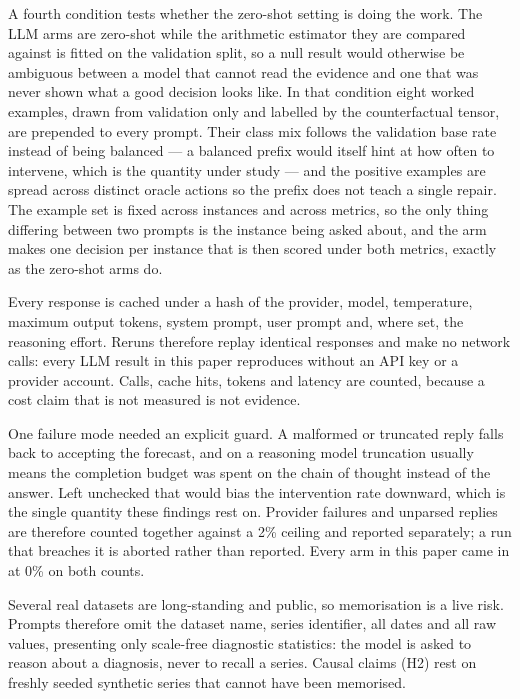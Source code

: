 A fourth condition tests whether the zero-shot setting is doing the work. The LLM arms
are zero-shot while the arithmetic estimator they are compared against is fitted on the
validation split, so a null result would otherwise be ambiguous between a model that
cannot read the evidence and one that was never shown what a good decision looks like.
In that condition eight worked examples, drawn from validation only and labelled by the
counterfactual tensor, are prepended to every prompt. Their class mix follows the
validation base rate instead of being balanced --- a balanced prefix would itself hint
at how often to intervene, which is the quantity under study --- and the positive
examples are spread across distinct oracle actions so the prefix does not teach a single
repair. The example set is fixed across instances and across metrics, so the only thing
differing between two prompts is the instance being asked about, and the arm makes one
decision per instance that is then scored under both metrics, exactly as the zero-shot
arms do.

Every response is cached under a hash of the provider, model, temperature, maximum
output tokens, system prompt, user prompt and, where set, the reasoning effort. Reruns
therefore replay identical responses and make no network calls: every LLM result in this
paper reproduces without an API key or a provider account. Calls, cache hits, tokens and
latency are counted, because a cost claim that is not measured is not evidence.

One failure mode needed an explicit guard. A malformed or truncated reply falls back to
accepting the forecast, and on a reasoning model truncation usually means the completion
budget was spent on the chain of thought instead of the answer. Left unchecked that
would bias the intervention rate downward, which is the single quantity these findings
rest on. Provider failures and unparsed replies are therefore counted together against a
2\% ceiling and reported separately; a run that breaches it is aborted rather than
reported. Every arm in this paper came in at 0\% on both counts.

Several real datasets are long-standing and public, so memorisation is a live risk.
Prompts therefore omit the dataset name, series identifier, all dates and all raw
values, presenting only scale-free diagnostic statistics: the model is asked to reason
about a diagnosis, never to recall a series. Causal claims (H2) rest on freshly seeded
synthetic series that cannot have been memorised.

